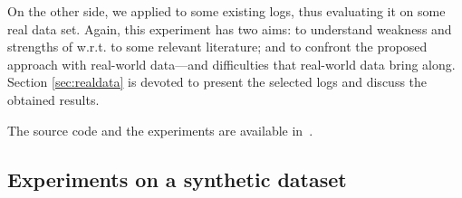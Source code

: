 On the other side, we applied \nd to some existing logs, thus evaluating it on some real data set. Again, this experiment has two aims: to understand weakness and strengths of \nd w.r.t. to some relevant literature; and to confront the proposed approach with real-world data---and difficulties that real-world data bring along. Section \ref{sec:realdata} is devoted to present the selected logs and discuss the obtained results.

The source code and the experiments are available in~\cite{negdis:2021_5158528}.




\subsection{Experiments on a synthetic dataset}
\label{sec:syntheticlog}

%


